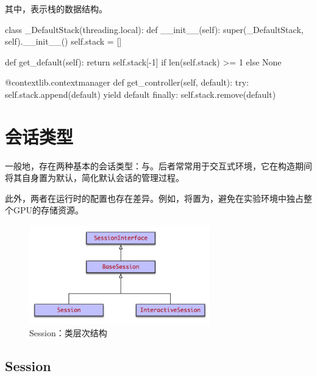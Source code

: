 \begin{content}
\begin{content}
其中，表示栈的数据结构。

\begin{leftbar}
\begin{python}
class _DefaultStack(threading.local):
  def __init__(self):
    super(_DefaultStack, self).__init__()
    self.stack = []

  def get_default(self):
    return self.stack[-1] if len(self.stack) >= 1 else None

  @contextlib.contextmanager
  def get_controller(self, default):
    try:
      self.stack.append(default)
      yield default
    finally:
      self.stack.remove(default)
\end{python}
\end{leftbar}

\end{content}

\section{会话类型}

\begin{content}

一般地，存在两种基本的会话类型：与。后者常常用于交互式环境，它在构造期间将其自身置为默认，简化默认会话的管理过程。

此外，两者在运行时的配置也存在差异。例如，将置为，避免在实验环境中独占整个GPU的存储资源。

\begin{figure}[!htbp]
\centering
\includegraphics[width=0.7\textwidth]{figures/py-session-hierarchy.png}
\caption{Session：类层次结构}
 \label{fig:py-session-hierarchy}
\end{figure}

\subsection{Session}


\end{content}
\end{content}
